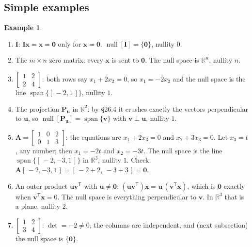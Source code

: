 \documentclass[11pt]{article}
\theoremstyle{plain}
\theoremstyle{definition}
\newtheorem{ex}{Example}[section]
\theoremstyle{remark}
\newcommand{\R}{\mathbb{R}}
\newcommand{\vc}[1]{\mathbf{#1}}
\newcommand{\mt}[1]{\mathbf{#1}}
\newcommand{\T}{^{\mathsf{T}}}
\newcommand{\nullsp}[1]{\operatorname{null}[#1]}
\DeclareMathOperator{\spanop}{span}
\begin{document}
\subsection{Simple examples}
\begin{ex}
\label{ex:nulls}
\leavevmode
\begin{enumerate}[label=(\alph*),leftmargin=2em,itemsep=4pt]
  \item $\mt{I}$: $\mt{I}\vc{x}=\vc{x}=\vc{0}$ only for $\vc{x}=\vc{0}$.
        $\nullsp{\mt{I}}=\{\vc{0}\}$, nullity $0$.
  \item The $m\times n$ zero matrix: every $\vc{x}$ is sent to $\vc{0}$.
        The null space is $\R^{n}$, nullity $n$.
  \item $\begin{bmatrix}1&2\\2&4\end{bmatrix}$: both rows say $x_1+2x_2=0$, so
        $x_1=-2x_2$ and the null space is the line $\spanop\{[\,-2,1\,]\}$,
        nullity $1$.
  \item The projection $\mt{P}_{\vc{u}}$ in $\R^{2}$: by \S26.4 it crushes
        exactly the vectors perpendicular to $\vc{u}$, so
        $\nullsp{\mt{P}_{\vc{u}}}=\spanop\{\vc{v}\}$ with $\vc{v}\perp\vc{u}$,
        nullity $1$.
  \item $\mt{A}=\begin{bmatrix}1&0&2\\0&1&3\end{bmatrix}$: the equations are
        $x_1+2x_3=0$ and $x_2+3x_3=0$. Let $x_3=t$, any number; then $x_1=-2t$
        and $x_2=-3t$. The null space is the line $\spanop\{[\,-2,-3,1\,]\}$ in
        $\R^{3}$, nullity $1$. Check: $\mt{A}[\,-2,-3,1\,]=[\,-2+2,\ -3+3\,]=\vc{0}$.
  \item An outer product $\vc{u}\vc{v}\T$ with $\vc{u}\neq\vc{0}$:
        $(\vc{u}\vc{v}\T)\vc{x}=\vc{u}\,(\vc{v}\T\vc{x})$, which is $\vc{0}$
        exactly when $\vc{v}\T\vc{x}=0$. The null space is everything
        perpendicular to $\vc{v}$. In $\R^{3}$ that is a plane, nullity $2$.
  \item $\begin{bmatrix}1&2\\3&4\end{bmatrix}$: $\det=-2\neq0$, the columns are
        independent, and (next subsection) the null space is $\{\vc{0}\}$.
\end{enumerate}
\end{ex}
\end{document}

